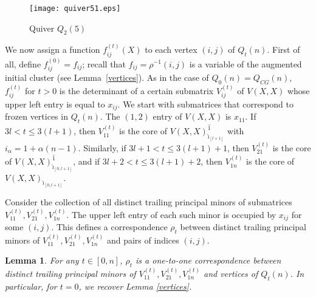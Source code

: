 \documentclass{amsart}
\newtheorem{lemma}[theorem]{Lemma}
\theoremstyle{definition}
\theoremstyle{remark}
\numberwithin{equation}{section}
\numberwithin{theorem}{section}
\begin{document}
\begin{figure}[ht]
\begin{center}
\texttt{[image: quiver51.eps]}
\caption{Quiver $Q_2(5)$}
\label{fig:q2(5)}
\end{center}
\end{figure}

We now assign a function $f_{ij}^{(t)}(X)$ to each vertex $(i,j)$ of $Q_t(n)$. First of all,
 define $f_{ij}^{(0)}=f_{ij}$; 
recall that $f_{ij}=\rho^{-1}(i,j)$ is a variable of the augmented initial cluster (see Lemma~\ref{vertices}).
As in
the case of $Q_0(n)=Q_{CG}(n)$, $f_{ij}^{(t)}$ for $t>0$ is the determinant of a certain
submatrix $V_{ij}^{(t)}$
of $V(X,X)$ whose upper left entry is equal to $x_{ij}$. We start with submatrices that
correspond to frozen vertices in $Q_t(n)$. The $(1,2)$ entry of $V(X,X)$ is
$x_{11}$. If
$3l < t \leq 3 (l+1)$,  then $V_{11}^{(t)}$ is the core of $V(X,X)^{\hat 1}_{\hat \imath_{[l+1]}}$ 
with $i_\alpha=1+\alpha(n-1)$. Similarly, if $3l + 1 < t \leq 3 (l+1)+1$, then
 $V_{21}^{(t)}$ is the core of
$V(X,X)^{\hat 1}_{\hat \imath_{[0,l+1]}}$, and  if $3l + 2 < t \leq 3 (l+1)+2$, then
$V_{1n}^{(t)}$ is the core of
$V(X,X)_{\hat \imath_{[0,l+1]}}$.

Consider the collection of all distinct trailing principal minors  of submatrices
$V_{11}^{(t)},  V_{21}^{(t)},  V_{1n}^{(t)}$. The upper left entry of each such minor is 
 occupied by $x_{ij}$ for some $(i,j)$. This defines
a correspondence $\rho_t$ between distinct trailing principal minors  of 
$V_{11}^{(t)},  V_{21}^{(t)},  V_{1n}^{(t)}$ and pairs of indices $(i,j)$.

\begin{lemma}
\label{rho_t}
For any $t\in[0,n]$, 
$\rho_t$ is a one-to-one correspondence between distinct trailing principal minors 
of  $V_{11}^{(t)},  V_{21}^{(t)},  V_{1n}^{(t)}$ and vertices of $Q_t(n)$. In
particular, for $t=0$,
we recover Lemma \ref{vertices}.
\end{lemma}
\end{document}
